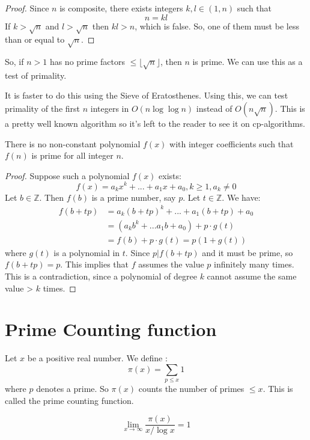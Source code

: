 \documentclass[12pt,letterpaper]{amsbook}
\theoremstyle{definition}
\newcommand{\Z}{\mathbb{Z}}
\begin{document}
\begin{proof}
  Since $n$ is composite, there exists integers $k,l \in (1,n)$   such that 
  \[n = kl\]
  If $k > \sqrt{n}$ and $l > \sqrt{n}$ then $kl > n$, which is false. So, one of them must be less than or equal to $\sqrt{n}$.
\end{proof}

So, if $n > 1$ has no prime factors $\leq \lfloor \sqrt{n} \rfloor$, then $n$ is prime. We can use this as a test of primality.

It is faster to do this using the Sieve of Eratosthenes. Using this, we can test primality of the first $n$ integers in $O(n \log{\log{n}})$ instead of $O(n\sqrt{n})$. This is a pretty well known algorithm so it's left to the reader to see it on cp-algorithms.

\begin{theorem}
  There is no non-constant polynomial $f(x)$ with integer coefficients such that $f(n)$ is prime for all integer $n$.  
\end{theorem}

\begin{proof}
  Suppose such a polynomial $f(x)$ exists:
  \[f(x) = a_kx^k + ... + a_1x + a_0, k \geq 1, a_k \neq 0\]
  Let $b \in \Z$. Then $f(b)$ is a prime number, say $p$. Let $t \in \Z$. We have:
  \begin{align*}
    f(b+tp) &= a_k(b+tp)^k + ... + a_1(b+tp) + a_0 \\
            &= (a_kb^k + ... a_1b + a_0) + p \cdot g(t) \\
            &= f(b) + p \cdot g(t) = p(1+g(t))
  \end{align*}
  where $g(t)$ is a polynomial in $t$. Since $p | f(b+tp)$ and it must be prime, so $f(b+tp) = p$. This implies that $f$ assumes the value $p$ infinitely many times. This is a contradiction, since a polynomial of degree $k$ cannot assume the same value > $k$ times.
\end{proof}

\section{Prime Counting function}
Let $x$ be a positive real number. We define :
\[\pi (x) = \sum_{p \leq x} 1\]
where $p$ denotes a prime. So $\pi (x)$ counts the number of primes $\leq x$. This is called the prime counting function.

\begin{theorem}
  \[\lim_{x \rightarrow \infty} \frac{\pi (x)}{x/\log{x}} = 1\]
\end{theorem}
\end{document}
